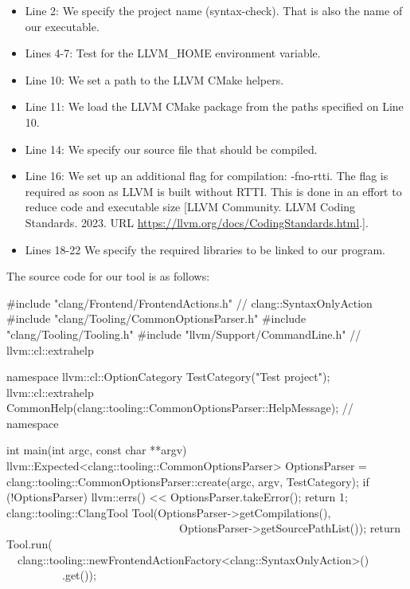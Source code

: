 \begin{itemize}
\item
Line 2: We specify the project name (syntax-check). That is also the name of our executable.

\item
Lines 4-7: Test for the LLVM\_HOME environment variable.

\item
Line 10: We set a path to the LLVM CMake helpers.

\item
Line 11: We load the LLVM CMake package from the paths specified on Line 10.

\item
Line 14: We specify our source file that should be compiled.

\item
Line 16: We set up an additional flag for compilation: -fno-rtti. The flag is required as soon as LLVM is built without RTTI. This is done in an effort to reduce code and executable size [LLVM Community. LLVM Coding Standards. 2023. URL \url{https://llvm.org/docs/CodingStandards.html}.].

\item
Lines 18-22 We specify the required libraries to be linked to our program.
\end{itemize}

The source code for our tool is as follows:

\begin{cpp}
#include "clang/Frontend/FrontendActions.h" // clang::SyntaxOnlyAction
#include "clang/Tooling/CommonOptionsParser.h"
#include "clang/Tooling/Tooling.h"
#include "llvm/Support/CommandLine.h" // llvm::cl::extrahelp

namespace {
  llvm::cl::OptionCategory TestCategory("Test project");
  llvm::cl::extrahelp
    CommonHelp(clang::tooling::CommonOptionsParser::HelpMessage);
} // namespace

int main(int argc, const char **argv) {
  llvm::Expected<clang::tooling::CommonOptionsParser> OptionsParser =
    clang::tooling::CommonOptionsParser::create(argc, argv, TestCategory);
  if (!OptionsParser) {
    llvm::errs() << OptionsParser.takeError();
    return 1;
  }
  clang::tooling::ClangTool Tool(OptionsParser->getCompilations(),
                                 OptionsParser->getSourcePathList());
  return Tool.run(
    clang::tooling::newFrontendActionFactory<clang::SyntaxOnlyAction>()
            .get());
}
\end{cpp}

